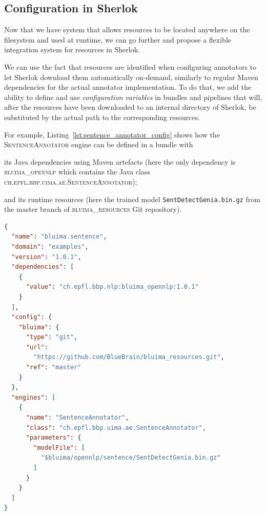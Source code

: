 \documentclass{article}
\newcommand{\ID}[1]{{\textsc{#1}}}
\newcommand{\PATH}[1]{\mbox{\texttt{#1}}}
\begin{document}
\subsection{Configuration in Sherlok}
\label{sec:config_in_sherlok}

Now that we have system that allows resources to be located anywhere on the filesystem and used at
runtime, we can go further and propose a flexible integration system for resources in Sherlok.

We can use the fact that resources are identified when configuring annotators to let Sherlok
download them automatically on-demand, similarly to regular Maven dependencies for the actual
annotator implementation. To do that, we add the ability to define and use \emph{configuration
variables} in bundles and pipelines that will, after the resources have been downloaded to an
internal directory of Sherlok, be substituted by the actual path to the corresponding resources.

For example, Listing~\ref{lst:sentence_annotator_config} shows how the \ID{SentenceAnnotator} engine
can be defined in a bundle with
\begin{enumerate*}[label=\itshape\alph*\upshape)]
    \item its Java dependencies using Maven artefacts (here the only dependency is
        \ID{bluima\_opennlp} which contains the Java class \ID{ch.epfl.bbp.uima.ae.SentenceAnnotator});
    \item and its runtime resources (here the trained model \PATH{SentDetectGenia.bin.gz} from the
        master branch of \ID{bluima\_resources} Git repository).
\end{enumerate*}

\begin{lstlisting}[float,language=json,
                   caption=Configuration of \ID{SentenceAnnotator} in a Sherlok bundle.,
                   label=lst:sentence_annotator_config]
{
  "name": "bluima.sentence",
  "domain": "examples",
  "version": "1.0.1",
  "dependencies": [
    {
      "value": "ch.epfl.bbp.nlp:bluima_opennlp:1.0.1"
    }
  ],
  "config": {
    "bluima": {
      "type": "git",
      "url":
        "https://github.com/BlueBrain/bluima_resources.git",
      "ref": "master"
    }
  },
  "engines": [
    {
      "name": "SentenceAnnotator",
      "class": "ch.epfl.bbp.uima.ae.SentenceAnnotator",
      "parameters": {
        "modelFile": [
          "$bluima/opennlp/sentence/SentDetectGenia.bin.gz"
        ]
      }
    }
  ]
}
\end{lstlisting}
\end{document}
